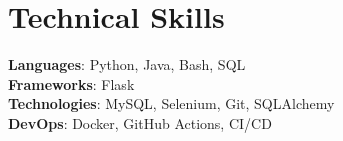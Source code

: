 \section{Technical Skills}
    \begin{itemize}[leftmargin=0.15in, label={}]
	\small{\item{
		\textbf{Languages}{: Python, Java, Bash, SQL} \\
		\textbf{Frameworks}{: Flask} \\
		\textbf{Technologies}{: MySQL, Selenium, Git, SQLAlchemy} \\
		\textbf{DevOps}{: Docker, GitHub Actions, CI/CD}
	}}
    \end{itemize}
